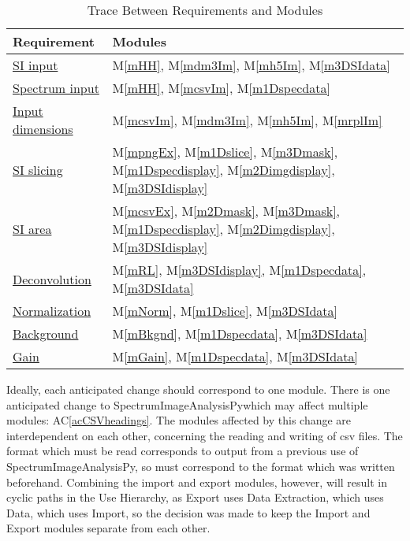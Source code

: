 \documentclass[12pt, titlepage]{article}
\newcommand{\acref}[1]{AC\ref{#1}}
\newcommand{\mref}[1]{M\ref{#1}}
\newcommand{\progname}{SpectrumImageAnalysisPy}
\begin{document}
\begin{table}[H]
	\centering
	\begin{tabular}{p{} p{}}
		\toprule
		\textbf{Requirement} & \textbf{Modules}\\
		\midrule
		\hyperref[R_SI_inputs]{SI input} & \mref{mHH}, \mref{mdm3Im}, \mref{mh5Im},
\mref{m3DSIdata}\\
		\hyperref[R_spectrum_inputs]{Spectrum input} & \mref{mHH}, \mref{mcsvIm},
\mref{m1Dspecdata}\\
		\hyperref[R_Input_dimension]{Input dimensions} & \mref{mcsvIm}, \mref{mdm3Im},
\mref{mh5Im}, \mref{mrplIm}\\
		\hyperref[R_SI_slicing]{SI slicing} & \mref{mpngEx}, \mref{m1Dslice},
\mref{m3Dmask}, \mref{m1Dspecdisplay}, \mref{m2Dimgdisplay},
\mref{m3DSIdisplay}\\
		\hyperref[R_SI_area]{SI area} & \mref{mcsvEx}, \mref{m2Dmask}, \mref{m3Dmask},
\mref{m1Dspecdisplay}, \mref{m2Dimgdisplay}, \mref{m3DSIdisplay}\\
		\hyperref[R_deconvolution]{Deconvolution} & \mref{mRL}, \mref{m3DSIdisplay},
\mref{m1Dspecdata}, \mref{m3DSIdata}\\
		\hyperref[R_normalization]{Normalization} & \mref{mNorm}, \mref{m1Dslice},
\mref{m3DSIdata}\\
		\hyperref[R_background]{Background} & \mref{mBkgnd}, \mref{m1Dspecdata},
\mref{m3DSIdata}\\
		\hyperref[R_gain]{Gain} & \mref{mGain}, \mref{m1Dspecdata}, \mref{m3DSIdata}\\
		\bottomrule
	\end{tabular}
	\caption{Trace Between Requirements and Modules}
	\label{TblRT}
\end{table}

Ideally, each anticipated change should correspond to one module. There is one
anticipated change to \progname which may affect multiple modules:
\acref{acCSVheadings}. The modules affected by this change are interdependent on
each other, concerning the reading and writing of csv files. The format which
must be read corresponds to output from a previous use of \progname, so must
correspond to the format which was written beforehand. Combining the import and
export modules, however, will result in cyclic paths in the Use Hierarchy, as
Export uses Data Extraction, which uses Data, which uses Import, so the decision
was made to keep the Import and Export modules separate from each other.\\
\end{document}
